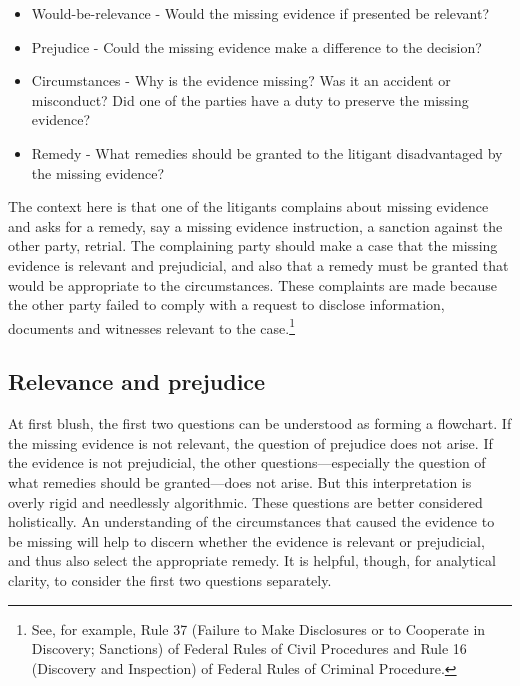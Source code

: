 \documentclass[
  10pt,
  dvipsnames,enabledeprecatedfontcommands]{scrartcl}
\begin{document}
\begin{itemize}
\item[] Would-be-relevance - Would the missing evidence if presented be relevant?
\item[] Prejudice - Could the missing evidence make a difference to the decision?
\item[] Circumstances - Why is the evidence missing? Was it an accident or misconduct? Did one of the parties have a duty to preserve the missing evidence?
\item[] Remedy - What remedies should be granted to the litigant disadvantaged 
by the missing evidence?
\end{itemize}

\noindent The context here is that one of the litigants complains about
missing evidence and asks for a remedy, say a missing evidence
instruction, a sanction against the other party, retrial. The
complaining party should make a case that the missing evidence is
relevant and prejudicial, and also that a remedy must be granted that
would be appropriate to the circumstances. These complaints are made
because the other party failed to comply with a request to disclose
information, documents and witnesses relevant to the case.\footnote{See,
  for example, Rule 37 (Failure to Make Disclosures or to Cooperate in
  Discovery; Sanctions) of Federal Rules of Civil Procedures and Rule 16
  (Discovery and Inspection) of Federal Rules of Criminal Procedure.}

\hypertarget{relevance-and-prejudice}{%
\subsection{Relevance and prejudice}\label{relevance-and-prejudice}}

At first blush, the first two questions can be understood as forming a
flowchart. If the missing evidence is not relevant, the question of
prejudice does not arise. If the evidence is not prejudicial, the other
questions---especially the question of what remedies should be
granted---does not arise. But this interpretation is overly rigid and
needlessly algorithmic. These questions are better considered
holistically. An understanding of the circumstances that caused the
evidence to be missing will help to discern whether the evidence is
relevant or prejudicial, and thus also select the appropriate remedy. It
is helpful, though, for analytical clarity, to consider the first two
questions separately.
\end{document}
